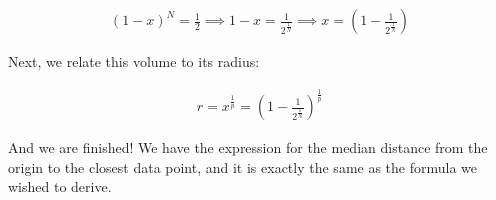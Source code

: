 \begin{gather*}
(1 - x)^{N} = \frac{1}{2} \implies 
1 - x = \frac{1}{2^{\frac{1}{N}}} \implies 
x = (1 - \frac{1}{2^{\frac{1}{N}}})
\end{gather*}

\noindent
Next, we relate this volume to its radius:

\begin{gather*}
r = 
x^{\frac{1}{p}} = 
(1 - \frac{1}{2^{\frac{1}{N}}})^{\frac{1}{p}}
\end{gather*}

\noindent
And we are finished! We have the expression for the median distance from the 
origin to the closest data point, and it is exactly the same as the formula 
we wished to derive.